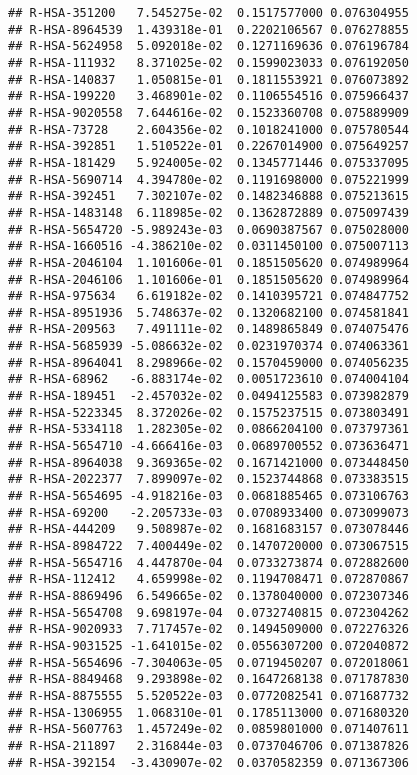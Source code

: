 \documentclass[
]{article}
\begin{document}
\begin{verbatim}
## R-HSA-351200   7.545275e-02  0.1517577000 0.076304955
## R-HSA-8964539  1.439318e-01  0.2202106567 0.076278855
## R-HSA-5624958  5.092018e-02  0.1271169636 0.076196784
## R-HSA-111932   8.371025e-02  0.1599023033 0.076192050
## R-HSA-140837   1.050815e-01  0.1811553921 0.076073892
## R-HSA-199220   3.468901e-02  0.1106554516 0.075966437
## R-HSA-9020558  7.644616e-02  0.1523360708 0.075889909
## R-HSA-73728    2.604356e-02  0.1018241000 0.075780544
## R-HSA-392851   1.510522e-01  0.2267014900 0.075649257
## R-HSA-181429   5.924005e-02  0.1345771446 0.075337095
## R-HSA-5690714  4.394780e-02  0.1191698000 0.075221999
## R-HSA-392451   7.302107e-02  0.1482346888 0.075213615
## R-HSA-1483148  6.118985e-02  0.1362872889 0.075097439
## R-HSA-5654720 -5.989243e-03  0.0690387567 0.075028000
## R-HSA-1660516 -4.386210e-02  0.0311450100 0.075007113
## R-HSA-2046104  1.101606e-01  0.1851505620 0.074989964
## R-HSA-2046106  1.101606e-01  0.1851505620 0.074989964
## R-HSA-975634   6.619182e-02  0.1410395721 0.074847752
## R-HSA-8951936  5.748637e-02  0.1320682100 0.074581841
## R-HSA-209563   7.491111e-02  0.1489865849 0.074075476
## R-HSA-5685939 -5.086632e-02  0.0231970374 0.074063361
## R-HSA-8964041  8.298966e-02  0.1570459000 0.074056235
## R-HSA-68962   -6.883174e-02  0.0051723610 0.074004104
## R-HSA-189451  -2.457032e-02  0.0494125583 0.073982879
## R-HSA-5223345  8.372026e-02  0.1575237515 0.073803491
## R-HSA-5334118  1.282305e-02  0.0866204100 0.073797361
## R-HSA-5654710 -4.666416e-03  0.0689700552 0.073636471
## R-HSA-8964038  9.369365e-02  0.1671421000 0.073448450
## R-HSA-2022377  7.899097e-02  0.1523744868 0.073383515
## R-HSA-5654695 -4.918216e-03  0.0681885465 0.073106763
## R-HSA-69200   -2.205733e-03  0.0708933400 0.073099073
## R-HSA-444209   9.508987e-02  0.1681683157 0.073078446
## R-HSA-8984722  7.400449e-02  0.1470720000 0.073067515
## R-HSA-5654716  4.447870e-04  0.0733273874 0.072882600
## R-HSA-112412   4.659998e-02  0.1194708471 0.072870867
## R-HSA-8869496  6.549665e-02  0.1378040000 0.072307346
## R-HSA-5654708  9.698197e-04  0.0732740815 0.072304262
## R-HSA-9020933  7.717457e-02  0.1494509000 0.072276326
## R-HSA-9031525 -1.641015e-02  0.0556307200 0.072040872
## R-HSA-5654696 -7.304063e-05  0.0719450207 0.072018061
## R-HSA-8849468  9.293898e-02  0.1647268138 0.071787830
## R-HSA-8875555  5.520522e-03  0.0772082541 0.071687732
## R-HSA-1306955  1.068310e-01  0.1785113000 0.071680320
## R-HSA-5607763  1.457249e-02  0.0859801000 0.071407611
## R-HSA-211897   2.316844e-03  0.0737046706 0.071387826
## R-HSA-392154  -3.430907e-02  0.0370582359 0.071367306

\end{verbatim}
\end{document}
